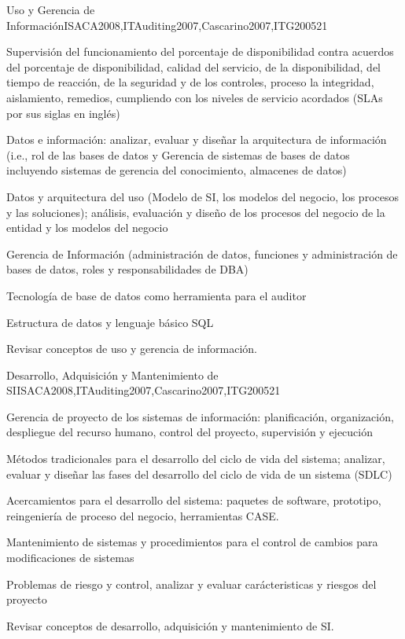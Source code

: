 \begin{syllabus}
\begin{unit}{Uso y Gerencia de Información}{ISACA2008,ITAuditing2007,Cascarino2007,ITG2005}{2}{1}
\begin{topics}
\item Supervisión del funcionamiento del porcentaje de disponibilidad contra acuerdos del porcentaje de disponibilidad, calidad del servicio, de la disponibilidad, del tiempo de reacción, de la seguridad y de los controles, proceso la integridad, aislamiento, remedios, cumpliendo con los niveles de servicio acordados (SLAs por sus siglas en
inglés)
\item Datos e información: analizar, evaluar y diseñar la arquitectura de información (i.e., rol de las bases de datos y Gerencia de sistemas de bases de datos incluyendo sistemas de gerencia del conocimiento, almacenes de datos)
\item Datos y arquitectura del uso (Modelo de SI, los modelos del negocio, los procesos y las soluciones); análisis, evaluación y diseño de los procesos del negocio de la entidad y los modelos del negocio
\item Gerencia de Información (administración de datos, funciones y administración de bases de datos, roles y responsabilidades de DBA)
\item Tecnología de base de datos como herramienta para el auditor
\item Estructura de datos y lenguaje básico SQL
\end{topics}
\begin{learningoutcomes}
\item Revisar conceptos de uso y gerencia de información.
\end{learningoutcomes}
\end{unit}

\begin{unit}{Desarrollo, Adquisición y Mantenimiento de SI}{ISACA2008,ITAuditing2007,Cascarino2007,ITG2005}{2}{1}
\begin{topics}
\item Gerencia de proyecto de los sistemas de información: planificación, organización, despliegue del recurso humano, control del proyecto, supervisión y ejecución
\item Métodos tradicionales para el desarrollo del ciclo de vida del sistema; analizar, evaluar y diseñar las fases del desarrollo del ciclo de vida de un sistema (SDLC)
\item Acercamientos para el desarrollo del sistema: paquetes de software, prototipo, reingeniería de proceso del negocio, herramientas CASE.
\item Mantenimiento de sistemas y procedimientos para el control de cambios para modificaciones de sistemas
\item Problemas de riesgo y control, analizar y evaluar carácteristicas y riesgos del proyecto
\end{topics}
\begin{learningoutcomes}
\item Revisar conceptos de desarrollo, adquisición y mantenimiento de SI.
\end{learningoutcomes}
\end{unit}


\end{syllabus}
